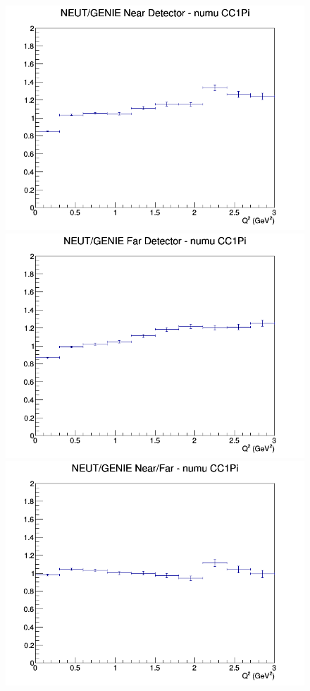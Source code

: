 \begin{figure}[h]
\endminipage
\newline
{}
\includegraphics[width=\linewidth]{eff_Q2/GAr/ratios/CC1Pi_NEUT_GENIE_numu_near_Q2.png}
\endminipage
{}
\includegraphics[width=\linewidth]{eff_Q2/GAr/ratios/CC1Pi_NEUT_GENIE_numu_far_Q2.png}
\endminipage
{}
\includegraphics[width=\linewidth]{eff_Q2/GAr/ratios/CC1Pi_NEUT_GENIE_numu_NF_Q2.png}

\end{figure}
